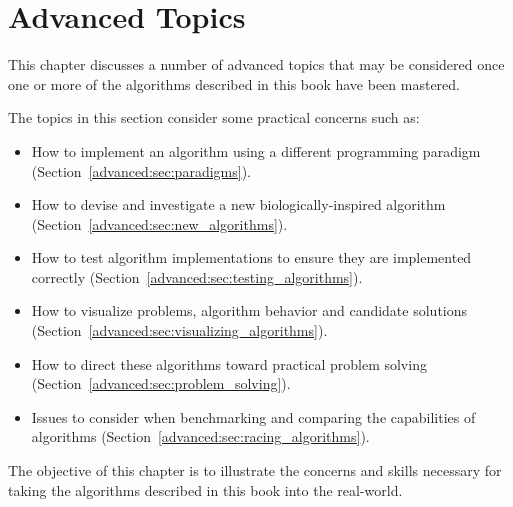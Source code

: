 

\renewcommand{\bibsection}{\subsection{\bibname}}
\chapter{Advanced Topics}
\label{ch:advanced}
This chapter discusses a number of advanced topics that may be considered once one or more of the algorithms described in this book have been mastered.

The topics in this section consider some practical concerns such as: 

\begin{itemize}
  \item How to implement an algorithm using a different programming paradigm (Section~\ref{advanced:sec:paradigms}).
  \item How to devise and investigate a new biologically-inspired algorithm (Section~\ref{advanced:sec:new_algorithms}).
  \item How to test algorithm implementations to ensure they are implemented correctly (Section~\ref{advanced:sec:testing_algorithms}).
  \item How to visualize problems, algorithm behavior and candidate solutions (Section~\ref{advanced:sec:visualizing_algorithms}).
  \item How to direct these algorithms toward practical problem solving (Section~\ref{advanced:sec:problem_solving}).
  \item Issues to consider when benchmarking and comparing the capabilities of algorithms (Section~\ref{advanced:sec:racing_algorithms}).
\end{itemize}

The objective of this chapter is to illustrate the concerns and skills necessary for taking the algorithms described in this book into the real-world.

